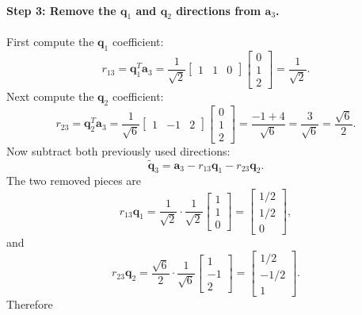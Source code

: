 \paragraph{Step 3: Remove the \(\mathbf{q}_1\) and \(\mathbf{q}_2\) directions from \(\mathbf{a}_3\).}

First compute the \(\mathbf{q}_1\) coefficient:
\[
    r_{13}
    =\mathbf{q}_1^T\mathbf{a}_3
    =\frac{1}{\sqrt{2}}
    \begin{bmatrix}
        1 & 1 & 0
    \end{bmatrix}
    \begin{bmatrix}
        0\\1\\2
    \end{bmatrix}
    =\frac{1}{\sqrt{2}}.
\]
Next compute the \(\mathbf{q}_2\) coefficient:
\[
    r_{23}
    =\mathbf{q}_2^T\mathbf{a}_3
    =\frac{1}{\sqrt{6}}
    \begin{bmatrix}
        1 & -1 & 2
    \end{bmatrix}
    \begin{bmatrix}
        0\\1\\2
    \end{bmatrix}
    =\frac{-1+4}{\sqrt{6}}
    =\frac{3}{\sqrt{6}}
    =\frac{\sqrt{6}}{2}.
\]
Now subtract both previously used directions:
\[
    \widetilde{\mathbf{q}}_3
    =\mathbf{a}_3-r_{13}\mathbf{q}_1-r_{23}\mathbf{q}_2.
\]
The two removed pieces are
\[
    r_{13}\mathbf{q}_1
    =\frac{1}{\sqrt{2}}\cdot\frac{1}{\sqrt{2}}
    \begin{bmatrix}
        1\\1\\0
    \end{bmatrix}
    =
    \begin{bmatrix}
        1/2\\1/2\\0
    \end{bmatrix},
\]
and
\[
    r_{23}\mathbf{q}_2
    =\frac{\sqrt{6}}{2}\cdot\frac{1}{\sqrt{6}}
    \begin{bmatrix}
        1\\-1\\2
    \end{bmatrix}
    =
    \begin{bmatrix}
        1/2\\-1/2\\1
    \end{bmatrix}.
\]
Therefore

